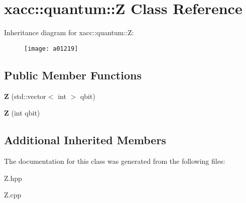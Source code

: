 \hypertarget{a01219}{}\section{xacc\+:\+:quantum\+:\+:Z Class Reference}
\label{a01219}
Inheritance diagram for xacc\+:\+:quantum\+:\+:Z\+:\begin{figure}[H]
\begin{center}
\leavevmode
\texttt{[image: a01219]}
\end{center}
\end{figure}
\subsection*{Public Member Functions}
\begin{DoxyCompactItemize}
\item 
\mbox{\label{a01219_a5f1d311b357faed8c2665fe20cf24aeb}} 
{\bfseries Z} (std\+::vector$<$ int $>$ qbit)
\item 
\mbox{\label{a01219_aa1bb7e533e7595e9ecd06879a2f8d2de}} 
{\bfseries Z} (int qbit)
\end{DoxyCompactItemize}
\subsection*{Additional Inherited Members}


The documentation for this class was generated from the following files\+:\begin{DoxyCompactItemize}
\item 
Z.\+hpp\item 
Z.\+cpp\end{DoxyCompactItemize}
